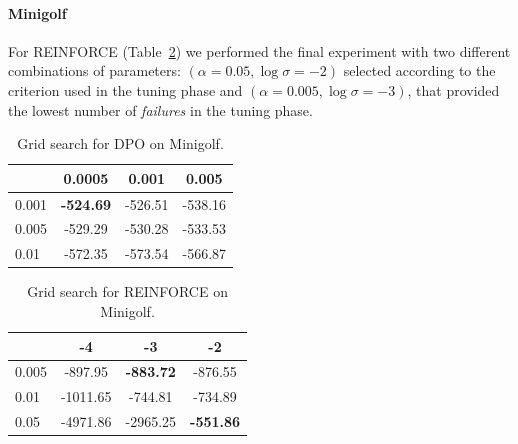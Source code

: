 \paragraph{Minigolf}
For REINFORCE (Table~\ref{tab:t2}) we performed the final experiment with two different combinations of parameters: $(\alpha=0.05, \log\sigma=-2)$ selected according to the criterion used in the tuning phase and $(\alpha=0.005, \log\sigma=-3)$, that provided the lowest number of \emph{failures} in the tuning phase.
\begin{table}[H]
	\centering
	\begin{tabular}{l|*{3}{c}}
		\toprule
		\backslashbox{$\alpha$}{$\lambda$}
		&0.0005&0.001&0.005\\
		\midrule
		0.001 & \textbf{-524.69} & -526.51 & -538.16 \\
		0.005 & -529.29 & -530.28 & -533.53 \\
		0.01 & -572.35 & -573.54 & -566.87 \\
		\bottomrule
	\end{tabular} \caption{\label{tab:t1} Grid search for \ac{DPO} on Minigolf.}
\end{table}
\begin{table}[H]
	\centering
	\begin{tabular}{l|*{3}{c}}
		\toprule
		\backslashbox{$\alpha$}{$\log\sigma$}
		&-4&-3&-2\\
		\midrule
		0.005 & -897.95 & \textbf{-883.72} & -876.55 \\
		0.01 & -1011.65 & -744.81 & -734.89 \\
		0.05 & -4971.86 & -2965.25 & \textbf{-551.86} \\
		\bottomrule
	\end{tabular} \caption{\label{tab:t2}Grid search for REINFORCE on Minigolf.}
\end{table}

